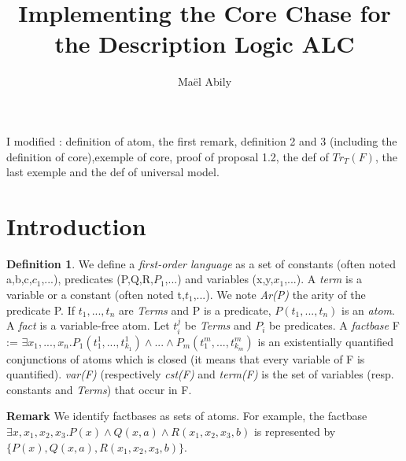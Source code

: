 \documentclass{article}
\title{Implementing the Core Chase for the Description Logic ALC}
\author{Maël Abily}	%
\theoremstyle{proposal}
\theoremstyle{definition}
\newtheorem{definition}{Definition}[section]
\theoremstyle{theorem}
\begin{document}
\maketitle						%


I modified : definition of atom, the first remark, definition 2 and 3 (including the definition of core),exemple of core, proof of proposal 1.2, the def of $Tr_{T}(F)$, the last exemple and the def of universal model.

\section{Introduction}

\begin{definition} We define a \emph{first-order language} as a set of constants (often noted a,b,c,$c_{1}$,...), predicates (P,Q,R,$P_{1}$,...) and variables (x,y,$x_{1}$,...). A \emph{term} is a variable or a constant (often noted t,$t_{1}$,...). We note \emph{Ar(P)} the arity of the predicate P. If $t_1,...,t_n$ are \textit{Terms} and P is a predicate, $P(t_{1},...,t_{n})$ is an \emph{atom}. A \emph{fact} is a variable-free atom. Let $t_i^j$ be \textit{Terms} and $P_i$ be predicates. A \emph{factbase} F := $\exists x_{1},...,x_{n}.P_{1}(t_{1}^{1},...,t_{k_{1}}^{1})\land ...\land P_{m}(t_{1}^{m},...,t_{k_{m}}^{m})$ is an existentially quantified conjunctions of atoms which is closed (it means that every variable of F is quantified). \emph{var(F)} (respectively \emph{cst(F)} and \emph{term(F)} is the set of variables (resp. constants and \textit{Terms}) that occur in F.
\end{definition}
\noindent \textbf{Remark} We identify factbases as sets of atoms. For example, the factbase $\exists x,x_{1},x_{2},x_{3}. P(x) \land Q(x,a) \land R(x_{1},x_{2},x_{3},b)$ is represented by \\
$\{P(x),Q(x,a),R(x_{1},x_{2},x_{3},b)\}$.
\end{document}
